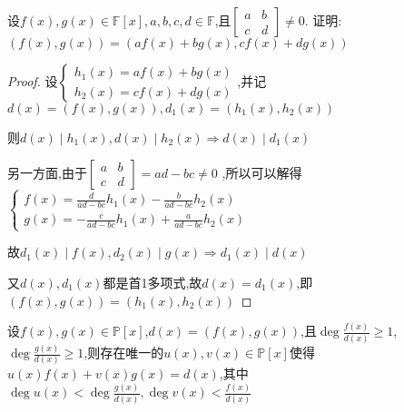 \begin{example}
    设$f(x),g(x)\in \mathbb{F}[x],a,b,c,d\in \mathbb{F}$,且$\begin{bmatrix}
        a & b \\ c & d
    \end{bmatrix} \ne 0$. 证明:$(f(x),g(x))=(af(x)+bg(x),cf(x)+dg(x))$
\end{example}

\begin{proof}

    设$\begin{cases}
        h_1(x)=af(x)+bg(x) \\ 
        h_2(x)=cf(x)+dg(x)
    \end{cases}$,并记$d(x)=(f(x),g(x)),d_1(x)=(h_1(x),h_2(x))$

    则$d(x)\mid h_1(x),d(x)\mid h_2(x)\Longrightarrow d(x)\mid d_1(x)$

    另一方面,由于$\begin{bmatrix}
        a & b \\ c & d
    \end{bmatrix} =ad-bc \ne 0$
    ,所以可以解得
    $\begin{cases}
        f(x)=\frac{d}{ad-bc}h_1(x)-\frac{b}{ad-bc}h_2(x) \\ 
        g(x)=-\frac{c}{ad-bc}h_1(x)+\frac{a}{ad-bc}h_2(x)
    \end{cases}$

    故$ d_1(x)\mid f(x),d_2(x)\mid g(x) \Longrightarrow d_1(x)\mid d(x)$

    又$d(x),d_1(x)$都是首1多项式,故$d(x)=d_1(x)$,即$(f(x),g(x))=(h_1(x),h_2(x))$
\end{proof}

\begin{example}\label{例题1.2.4}
    设$f(x),g(x)\in \mathbb{P}[x]$,$d(x)=(f(x),g(x))$,且$\deg \frac{f(x)}{d(x)}\ge 1$,$\deg \frac{g(x)}{d(x)}\ge 1$,则存在唯一的$u(x),v(x)\in \mathbb{P}[x]$使得$u(x)f(x)+v(x)g(x)=d(x)$,其中$\deg u(x)<\deg \frac{g(x)}{d(x)},\deg v(x)<\frac{f(x)}{d(x)}$
\end{example}

